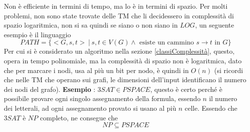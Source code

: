 \documentclass[10pt, letterpaper]{report}
\begin{document}
Non è efficiente in termini di tempo, ma lo è in termini di spazio. Per molti problemi, non sono state trovate delle TM che li decidessero in complessità di spazio logaritmica, non si sa quindi se siano o non siano in $LOG$, un seguente esempio è il linguaggio
$$ PATH = \{<G,s,t> \ | \ s,t\in V(G) \land \text{ esiste un cammino }s\rightarrow t\text{ in }G\}$$
Per cui si è considerato un algoritmo nella sezione \ref{classiComplessità}, questo, opera in tempo polinomiale, ma la complessità di spazio non è logaritmica, dato che per marcare i nodi, usa al più un bit per nodo, è quindi in $O(n)$ (si ricordi che nelle TM che operano sui grafi, le dimensioni dell'input identificano il numero dei nodi del grafo).\acc 
\textbf{Esempio} : $3SAT\in PSPACE$, questo è certo perché è possibile provare ogni singolo assegnamento della formula, essendo $n$ il numero dei letterali, ad ogni assegnamento provato si usano al più $n$ celle.\acc 
Essendo che $3SAT$ è $NP$ completo, ne consegue  che $$NP\subseteq PSPACE $$
\flowerLine
\end{document}

